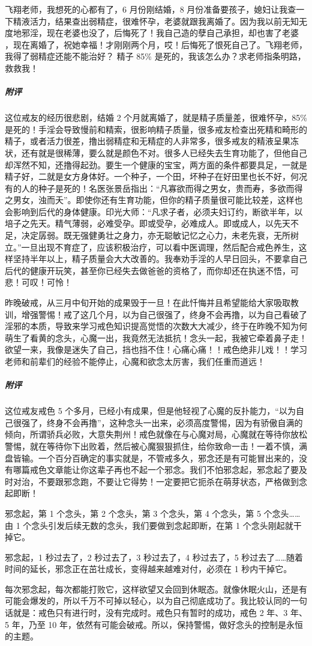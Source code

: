 \begin{case}
    飞翔老师，我想死的心都有了，6 月份刚结婚，8 月份准备要孩子，媳妇让我查一下精液活力，结果查出弱精症，很难怀孕，老婆就跟我离婚了。因为我以前无知无度地邪淫，现在老婆也没了，后悔死了！我自己造的孽自己承担，却也害了老婆 ，现在离婚了，祝她幸福！才刚刚两个月，哎！后悔死了恨死自己了。飞翔老师，我得了弱精症还能不能治好？ 精子 85\% 是死的，我该怎么办？求老师指条明路，救救我！
    \subparagraph{附评} 这位戒友的经历很悲剧，结婚 2 个月就离婚了，就是精子质量差，很难怀孕，85\% 是死的！手淫会导致慢前和精索，很影响精子质量，很多戒友检查出死精和畸形的精子，或者活力很差，撸出弱精症和无精症的人非常多，很多戒友的精液呈果冻状，还有就是很稀薄，要么就是颜色不对。很多人已经失去生育功能了，但他自己却浑然不知，还撸得起劲。要生一个健康的宝宝，两方面的条件都要具足，一就是精子好，二就是女方身体好。一个种子，一个田，坏种子在好田里也长不好，何况有的人的种子是死的！名医张景岳指出：“凡寡欲而得之男女，贵而寿，多欲而得之男女，浊而夭”。即使你还有生育功能，但你的精子质量很可能比较差，这样也会影响到后代的身体健康。印光大师：“凡求子者，必须夫妇订约，断欲半年，以培子之先天。精气薄弱，必难受孕。即或受孕，必难成人。即或成人，以先天不足，决定孱弱。既无强健勇壮之身力，亦无聪敏记忆之心力，未老先衰，无所树立。”一旦出现不育症了，应该积极治疗，可以看中医调理，然后配合戒色养生，这样坚持半年以上，精子质量会大大改善的。我奉劝手淫的人早日回头，不要拿自己后代的健康开玩笑，甚至你已经失去做爸爸的资格了，而你却还在执迷不悟，可悲！可叹！可怜！
\end{case}

\begin{case}
    昨晚破戒，从三月中旬开始的成果毁于一旦！在此忏悔并且希望能给大家吸取教训，增强警惕！戒了这几个月，以为自己很强了，终身不会再撸，以为自己看破了淫邪的本质，导致来学习戒色知识提高觉悟的次数大大减少，终于在昨晚不知为何萌生了看黄的念头，心魔一出，我竟然无法抵抗！念头一起，我被它牵着鼻子走！欲望一来，我像是迷失了自己，挡也挡不住！心痛心痛！！戒色绝非儿戏！！学习老师和前辈们的经验不能停止，心魔和欲念太厉害，我们任重而道远！
    \subparagraph{附评} 这位戒友戒色 5 个多月，已经小有成果，但是他轻视了心魔的反扑能力，“以为自己很强了，终身不会再撸”，这种念头一出来，必须高度警惕，因为有骄傲自满的倾向，所谓骄兵必败，大意失荆州！戒色就像在与心魔对局，心魔就在等待你放松警惕，就在等待你下出败着，然后被心魔狠狠抓住，给你致命一击！一着不慎，满盘皆输。一个百分百确定的事实就是，不管戒多久，邪念还是有可能冒出来的，没有哪篇戒色文章能让你这辈子再也不起一个邪念。我们不怕邪念起，邪念起了要及时对治，不要跟邪念跑，不要让它得势！一定要把它扼杀在萌芽状态，严格做到念起即断！

    邪念起，第 1 个念头，第 2 个念头，第 3 个念头，第 4 个念头，第 5 个念头……由 1 个念头引发后续无数的念头，我们要做到念起即断，在第 1 个念头刚起就干掉它。

    邪念起，1 秒过去了，2 秒过去了，3 秒过去了，4 秒过去了，5 秒过去了……随着时间的延长，邪念正在茁壮成长，变得越来越难对付，必须在 1 秒内干掉它。

    每次邪念起，每次都能打败它，这样欲望又会回到休眠态。就像休眠火山，还是有可能会爆发的，所以千万不可掉以轻心，以为自己彻底成功了。我比较认同的一句话就是：戒色只有进行时，没有完成时。戒色只有暂时的成功，戒色 2 年、3 年、5 年，乃至 10 年，依然有可能会破戒。所以，保持警惕，做好念头的控制是永恒的主题。
\end{case}

